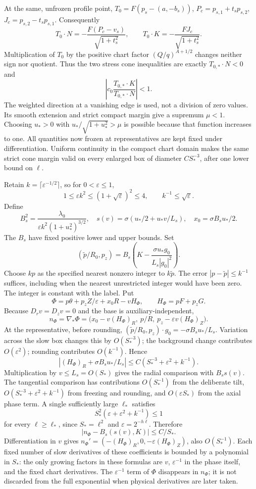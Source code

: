 \documentclass[10pt,a4paper]{article}
\begin{document}
At the same, unfrozen profile point, \(T_0=F(p_s-(a,-b_s))\), \(P_c=p_{s,1}+t_sp_{s,2}\), \(J_c=p_{s,2}-t_sp_{s,1}\). Consequently \[
T_0\cdot N=-\frac{F(P_c-v_s)}{\sqrt{1+t_s^2}},
\qquad
T_0\cdot K=-\frac{FJ_c}{\sqrt{1+t_s^2}}.
\] Multiplication of \(T_0\) by the positive chart factor \((Q/q)^{A+1/2}\) changes neither sign nor quotient. Thus the two stress cone inequalities are exactly \(T_{0,*}\cdot N<0\) and \[
\left|c_0\frac{T_{0,*}\cdot K}{T_{0,*}\cdot N}\right|<1.
\] The weighted direction at a vanishing edge is used, not a division of zero values. Its smooth extension and strict compact margin give a supremum \(\mu<1\). Choosing \(u_*>0\) with \(u_*/\sqrt{1+u_*^2}>\mu\) is possible because that function increases to one. All quantities now frozen at representatives are kept fixed under differentiation. Uniform continuity in the compact chart domain makes the same strict cone margin valid on every enlarged box of diameter \(CS_*^{-3}\), after one lower bound on \(\ell\).

Retain \(k=\lceil\varepsilon^{-1/2}\rceil\), so for \(0<\varepsilon\le1\), \[
1\le\varepsilon k^2\le(1+\sqrt\varepsilon)^2\le4,\qquad
k^{-1}\le\sqrt\varepsilon.
\] Define \[
B_s^2=\frac{\lambda_0}{\varepsilon k^2(1+u_*^2)^{3/2}},
\quad s(v)=\sigma(u_*/2+u_*v/L_s),\quad x_0=\sigma B_su_*/2.
\] The \(B_s\) have fixed positive lower and upper bounds. Set \[
(\widetilde p/R_0,p_z)
=B_s\left(K-\frac{\sigma u_*g_0}{L_s|g_0|^2}\right).
\] Choose \(kp\) as the specified nearest nonzero integer to \(k\widetilde p\). The error \(|p-\widetilde p|\le k^{-1}\) suffices, including when the nearest unrestricted integer would have been zero. The integer is constant with the label. Put \[
\Phi=p\theta+p_zZ/\varepsilon+x_0R-vH_\Phi,\qquad H_\Phi=pF+p_zG.
\] Because \(D_rv=D_zv=0\) and the base is auxiliary-independent, \[
n_\Phi=\nabla_*\Phi
=\bigl(x_0-v(H_\Phi)_R,\ p/R,\ p_z-\varepsilon v(H_\Phi)_Z\bigr).
\] At the representative, before rounding, \((\widetilde p/R_0,p_z)\cdot g_0=-\sigma B_su_*/L_s\). Variation across the slow box changes this by \(O(S_*^{-3})\); the background change contributes \(O(\varepsilon^2)\); rounding contributes \(O(k^{-1})\). Hence \[
|(H_\Phi)_R+\sigma B_su_*/L_s|
\le C(S_*^{-3}+\varepsilon^2+k^{-1}).
\] Multiplication by \(v\le L_s=O(S_*)\) gives the radial comparison with \(B_ss(v)\). The tangential comparison has contributions \(O(S_*^{-1})\) from the deliberate tilt, \(O(S_*^{-3}+\varepsilon^2+k^{-1})\) from freezing and rounding, and \(O(\varepsilon S_*)\) from the axial phase term. A single sufficiently large \(\ell_*\) satisfies \[
S_*^2(\varepsilon+\varepsilon^2+k^{-1})\le1
\] for every \(\ell\ge\ell_*\), since \(S_*=\ell^2\) and \(\varepsilon=2^{-h\ell}\). Therefore \[
|n_\Phi-B_s(s(v),K)|\le C/S_*.
\] Differentiation in \(v\) gives \(n_\Phi'=(-(H_\Phi)_R,0,-\varepsilon(H_\Phi)_Z)\), also \(O(S_*^{-1})\). Each fixed number of slow derivatives of these coefficients is bounded by a polynomial in \(S_*\): the only growing factors in these formulas are \(v\), \(\varepsilon^{-1}\) in the phase itself, and the fixed chart derivatives. The \(\varepsilon^{-1}\) term of \(\Phi\) disappears in \(n_\Phi\); it is not discarded from the full exponential when physical derivatives are later taken.
\end{document}
